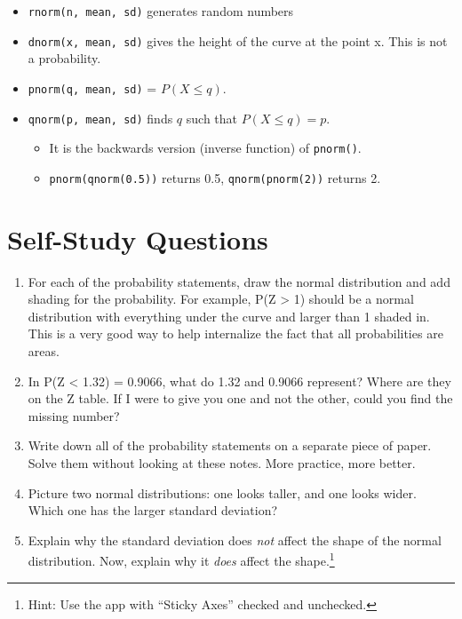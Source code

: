 \documentclass[
  letterpaper,
  DIV=11,
  numbers=noendperiod]{scrreprt}
\providecommand{\tightlist}{%
  \setlength{\itemsep}{0pt}\setlength{\parskip}{0pt}}\usepackage{longtable,booktabs,array}
\begin{document}
\begin{itemize}
  \begin{itemize}
  \tightlist
  \item
    \texttt{rnorm(n,\ mean,\ sd)} generates random numbers
  \item
    \texttt{dnorm(x,\ mean,\ sd)} gives the height of the curve at the
    point x. This is not a probability.
  \item
    \texttt{pnorm(q,\ mean,\ sd)} = \(P(X \le q)\).
  \item
    \texttt{qnorm(p,\ mean,\ sd)} finds \(q\) such that
    \(P(X \le q) = p\).

    \begin{itemize}
    \tightlist
    \item
      It is the backwards version (inverse function) of
      \texttt{pnorm()}.
    \item
      \texttt{pnorm(qnorm(0.5))} returns 0.5, \texttt{qnorm(pnorm(2))}
      returns 2.
    \end{itemize}
  \end{itemize}
\end{itemize}

\hypertarget{self-study-questions-1}{%
\section{Self-Study Questions}\label{self-study-questions-1}}

\begin{enumerate}
\def\labelenumi{\arabic{enumi}.}
\tightlist
\item
  For each of the probability statements, draw the normal distribution
  and add shading for the probability. For example, P(Z \textgreater{}
  1) should be a normal distribution with everything under the curve and
  larger than 1 shaded in. This is a very good way to help internalize
  the fact that all probabilities are areas.
\item
  In P(Z \textless{} 1.32) = 0.9066, what do 1.32 and 0.9066 represent?
  Where are they on the Z table. If I were to give you one and not the
  other, could you find the missing number?
\item
  Write down all of the probability statements on a separate piece of
  paper. Solve them without looking at these notes. More practice, more
  better.
\item
  Picture two normal distributions: one looks taller, and one looks
  wider. Which one has the larger standard deviation?
\item
  Explain why the standard deviation does \emph{not} affect the shape of
  the normal distribution. Now, explain why it \emph{does} affect the
  shape.\footnote{Hint: Use the app with ``Sticky Axes'' checked and
    unchecked.}
\end{enumerate}
\end{document}

